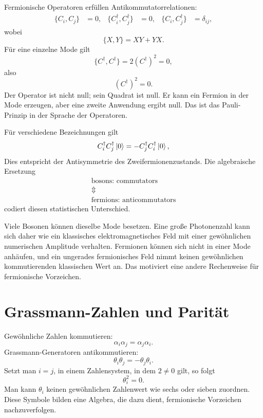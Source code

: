 Fermionische Operatoren erfüllen Antikommutatorrelationen:
\begin{align}
\{C_i,C_j\}&=0,&
\{C_i^\dagger,C_j^\dagger\}&=0,&
\{C_i,C_j^\dagger\}&=\delta_{ij},
\end{align}
wobei
\begin{equation}
\{X,Y\}=XY+YX.
\end{equation}
Für eine einzelne Mode gilt
\begin{equation}
\{C^\dagger,C^\dagger\}=2(C^\dagger)^2=0,
\end{equation}
also
\begin{equation}
(C^\dagger)^2=0.
\end{equation}
Der Operator ist nicht null; sein Quadrat ist null. Er kann ein Fermion in der Mode erzeugen, aber eine zweite Anwendung ergibt null. Das ist das Pauli-Prinzip in der Sprache der Operatoren.

Für verschiedene Bezeichnungen gilt
\begin{equation}
C_i^\dagger C_j^\dagger\left\lvert0\right\rangle
=-C_j^\dagger C_i^\dagger\left\lvert0\right\rangle,
\end{equation}
Dies entspricht der Antisymmetrie des Zweifermionenzustands. Die algebraische Ersetzung
\begin{equation}
\begin{gathered}
\text{bosons: commutators}\\
\Updownarrow\\
\text{fermions: anticommutators}
\end{gathered}
\end{equation}
codiert diesen statistischen Unterschied.

Viele Bosonen können dieselbe Mode besetzen. Eine große Photonenzahl kann sich daher wie ein klassisches elektromagnetisches Feld mit einer gewöhnlichen numerischen Amplitude verhalten. Fermionen können sich nicht in einer Mode anhäufen, und ein ungerades fermionisches Feld nimmt keinen gewöhnlichen kommutierenden klassischen Wert an. Das motiviert eine andere Rechenweise für fermionische Vorzeichen.

\section{Grassmann-Zahlen und Parität}

Gewöhnliche Zahlen kommutieren:
\begin{equation}
\alpha_i\alpha_j=\alpha_j\alpha_i.
\end{equation}
Grassmann-Generatoren antikommutieren:
\begin{equation}
\theta_i\theta_j=-\theta_j\theta_i.
\end{equation}
Setzt man \(i=j\), in einem Zahlensystem, in dem \(2\neq0\) gilt, so folgt
\begin{equation}
\theta_i^2=0.
\end{equation}
Man kann \(\theta_i\) keinen gewöhnlichen Zahlenwert wie sechs oder sieben zuordnen. Diese Symbole bilden eine Algebra, die dazu dient, fermionische Vorzeichen nachzuverfolgen.


